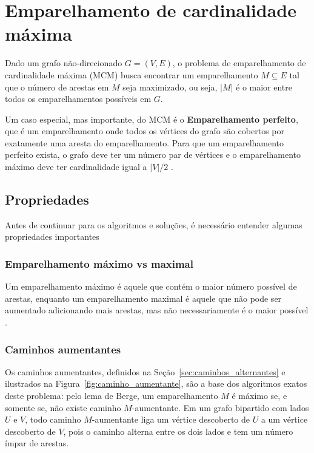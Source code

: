 \section{Emparelhamento de cardinalidade máxima}
\label{sec:emp_card_max_bip}

Dado um grafo não-direcionado $G=(V,E)$, o problema de emparelhamento de cardinalidade máxima (MCM) busca encontrar um emparelhamento $M \subseteq E$ tal que o número de arestas em $M$ seja maximizado, ou seja, $|M|$ é o maior entre todos os emparelhamentos possíveis em $G$.

Um caso especial, mas importante, do MCM é o \textbf{Emparelhamento perfeito}, que é um emparelhamento onde todos os vértices do grafo são cobertos por exatamente uma aresta do emparelhamento. Para que um emparelhamento perfeito exista, o grafo deve ter um número par de vértices e o emparelhamento máximo deve ter cardinalidade igual a $|V|/2$ \cite{jungnickel}.

\subsection{Propriedades}

Antes de continuar para os algoritmos e soluções, é necessário entender algumas propriedades importantes

\subsubsection{Emparelhamento máximo vs maximal}
\label{p:emp_max_maximal}

Um emparelhamento máximo é aquele que contém o maior número possível de arestas, enquanto um emparelhamento maximal é aquele que não pode ser aumentado adicionando mais arestas, mas não necessariamente é o maior possível \cite{manber}.

\subsubsection{Caminhos aumentantes}
\label{p:caminhos_aumentantes}

Os caminhos aumentantes, definidos na Seção~\ref{sec:caminhos_alternantes} e ilustrados na Figura~\ref{fig:caminho_aumentante}, são a base dos algoritmos exatos deste problema: pelo lema de Berge, um emparelhamento $M$ é máximo se, e somente se, não existe caminho $M$-aumentante. Em um grafo bipartido com lados $U$ e $V$, todo caminho $M$-aumentante liga um vértice descoberto de $U$ a um vértice descoberto de $V$, pois o caminho alterna entre os dois lados e tem um número ímpar de arestas.

